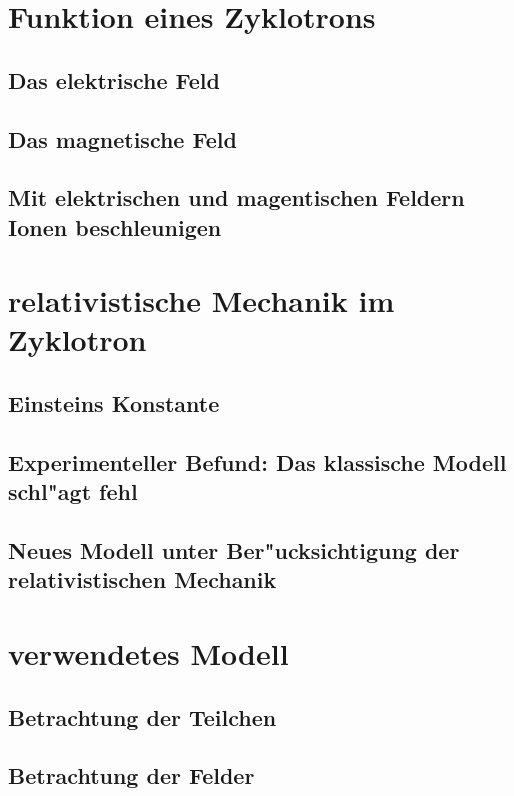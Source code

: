 \documentclass[14pt, a4paper]{report}
\begin{document}
\chapter{Funktion eines Zyklotrons}
\section{Das elektrische Feld}
\section{Das magnetische Feld}
\section{Mit elektrischen und magentischen Feldern Ionen beschleunigen}


\chapter{relativistische Mechanik im Zyklotron}
\section{Einsteins Konstante}
\section{Experimenteller Befund: Das klassische Modell schl"agt fehl}
\section{Neues Modell unter Ber"ucksichtigung der relativistischen Mechanik}

\chapter{verwendetes Modell}
\section{Betrachtung der Teilchen}
\section{Betrachtung der Felder}
\end{document}
